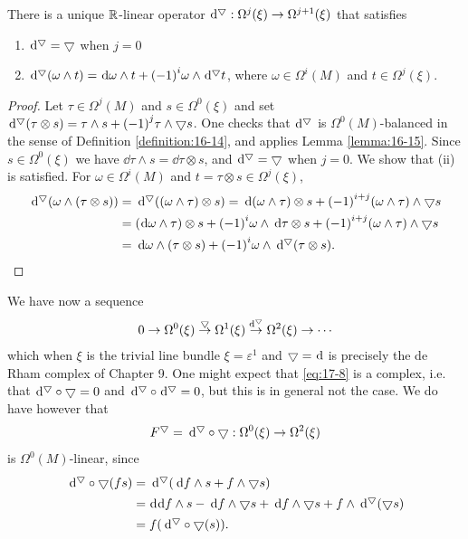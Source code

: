 \begin{lemma}\label{lemma:17-6}
There is a unique ${\mathbb{R}}$-linear operator $\dd^\btd:\Omega^{j}(\xi)  \ra  \Omega^{j + 1}(\xi)$ that satisfies
\begin{enumerate}
  \item $\dd^\btd = \btd$ when $j = 0$
  \item $\dd^\btd( {\omega  \land  t})  = {\dd\omega } \land  t + {(-1) }^{i}\omega  \land  \dd^\btd t$, 
    where $\omega  \in  \Omega^{i}(M)$ and $t \in  \Omega^{j}(\xi)$. 
\end{enumerate}
\end{lemma}

\begin{proof} 
Let $\tau  \in  \Omega^{j}(M)$ and $s \in  \Omega^0(\xi)$ and 
set $\dd^\btd( {\tau  \otimes  s})  = \tau \land  s + {(-1) }^{j}\tau  \land  \btd s$. 
One checks that $\dd^\btd$ is $\Omega^0(M)$-balanced in the sense of Definition \ref{definition:16-14}, 
and applies Lemma \ref{lemma:16-15}. Since $s \in  \Omega^0(\xi)$ we have ${\dd\tau } \land  s = {\dd\tau } \otimes  s$, 
and $\dd^\btd = \btd$ when $j = 0$. We show that (ii) is satisfied. 
For $\omega  \in  \Omega^{i}(M)$ and $t = \tau  \otimes  s \in  \Omega^{j}(\xi)$,
\begin{align*}
  \dd^\btd( {\omega  \land  ( {\tau  \otimes  s}) }) 
  & = \dd^\btd( {( {\omega  \land  \tau })  \otimes  s})  
    = \dd( {\omega  \land  \tau })  \otimes  s + {(-1) }^{i + j}( {\omega  \land  \tau })  \land  \btd s\\
  & = (\!{{\dd\omega } \land  \tau })  \otimes  s + {(-1) }^{i}\omega  \land  {\dd\tau } \otimes  s + {(-1) }^{i + j}( {\omega  \land  \tau })  \land  \btd s\\
  & = {\dd\omega } \land  ( {\tau  \otimes  s})  + {(-1) }^{i}\omega  \land  \dd^\btd( {\tau  \otimes  s}).
\end{align*}
\end{proof}

We have now a sequence
\begin{align}\label{eq:17-8}
  0 \ra  \Omega^0(\xi) \overset\btd
  { \ra  }\Omega^1(\xi) \overset{\dd^\btd}
  { \ra  }\Omega^{2}(\xi) 
  \ra  \cdots
\end{align}
which when $\xi$ is the trivial line bundle $\xi  = {\varepsilon }^1$ and $\btd = \dd$ is precisely 
the de Rham complex of Chapter 9. One might expect that \eqref{eq:17-8} is a complex, i.e. 
that $\dd^\btd \circ \btd = 0$ and $\dd^\btd \circ\dd^\btd = 0$, but 
this is in general not the case. We do have however that
\[
  {F}^\btd = \dd^\btd \circ  \btd :\Omega^0(\xi)\ra\Omega^{2}(\xi)
\]
is $\Omega^0(M)$-linear, since
\begin{align*}
  \dd^\btd \circ  \btd ( fs) 
  & = \dd^\btd( {\dd f \land  s + f \land  \btd s}) \\
  & = \!{\dd\!\dd f} \land  s- \dd f \land   \btd  s + \dd f \land\btd  s + f \land  \dd^\btd( { \btd  s})\\
  & = f( {\dd^\btd \circ  \btd (s) }).
\end{align*}

